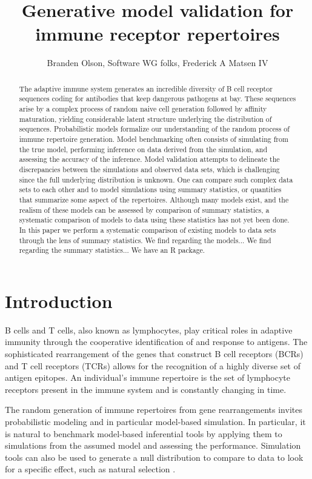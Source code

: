 \documentclass{article}
\title{Generative model validation for immune receptor repertoires}
\author{Branden Olson, Software WG folks, Frederick A Matsen IV}
\begin{document}
\maketitle

\begin{abstract}
The adaptive immune system generates an incredible diversity of B cell receptor sequences coding for antibodies that keep dangerous pathogens at bay.
These sequences arise by a complex process of random naive cell generation followed by affinity maturation, yielding considerable latent structure underlying the distribution of sequences.
Probabilistic models formalize our understanding of the random process of immune repertoire generation.
Model benchmarking often consists of simulating from the true model, performing inference on data derived from the simulation, and assessing the accuracy of the inference.
Model validation attempts to delineate the discrepancies between the simulations and observed data sets, which is challenging since the full underlying distribution is unknown.
One can compare such complex data sets to each other and to model simulations using summary statistics, or quantities that summarize some aspect of the repertoires.
Although many models exist, and the realism of these models can be assessed by comparison of summary statistics, a systematic comparison of models to data using these statistics has not yet been done.
In this paper we perform a systematic comparison of existing models to data sets through the lens of summary statistics.
We find regarding the models...
We find regarding the summary statistics...
We have an R package.
\end{abstract}

\section*{Introduction}

B cells and T cells, also known as lymphocytes, play critical roles in adaptive immunity through the cooperative identification of and response to antigens.
The sophisticated rearrangement of the genes that construct B cell receptors (BCRs) and T cell receptors (TCRs) allows for the recognition of a highly diverse set of antigen epitopes.
An individual's immune repertoire is the set of lymphocyte receptors present in the immune system and is constantly changing in time.

The random generation of immune repertoires from gene rearrangements invites probabilistic modeling and in particular model-based simulation.
In particular, it is natural to benchmark model-based inferential tools by applying them to simulations from the assumed model and assessing the performance.
Simulation tools can also be used to generate a null distribution to compare to data to look for a specific effect, such as natural selection \cite{Yaari2012-kk}.
\end{document}
